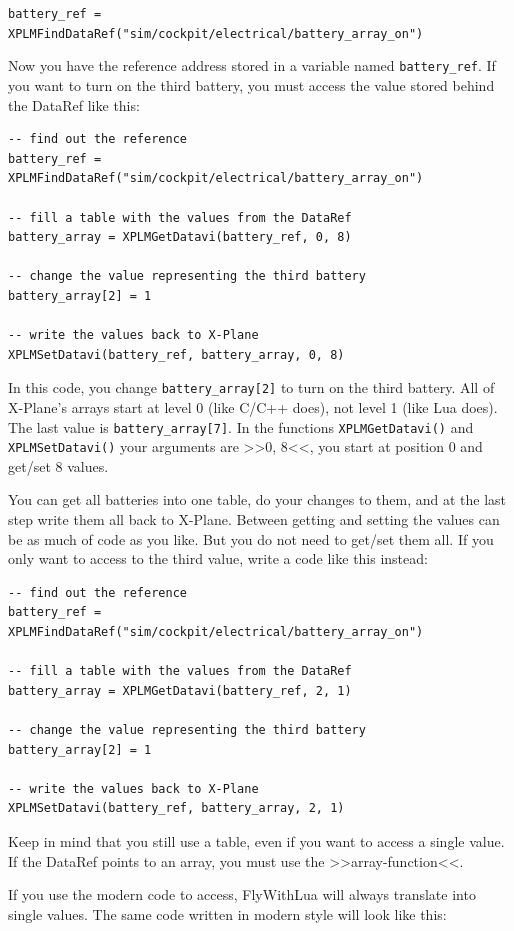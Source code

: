 \documentclass[11pt,parskip=half,a4paper]{scrartcl}
\begin{document}
\verb|battery_ref = XPLMFindDataRef("sim/cockpit/electrical/battery_array_on")|

Now you have the reference address stored in a variable named \verb|battery_ref|. If you want to turn on the third battery, you must access the value stored behind the DataRef like this:

\begin{lstlisting}
-- find out the reference
battery_ref = XPLMFindDataRef("sim/cockpit/electrical/battery_array_on")

-- fill a table with the values from the DataRef
battery_array = XPLMGetDatavi(battery_ref, 0, 8)

-- change the value representing the third battery
battery_array[2] = 1

-- write the values back to X-Plane
XPLMSetDatavi(battery_ref, battery_array, 0, 8)
\end{lstlisting}

In this code, you change \verb|battery_array[2]| to turn on the third battery. All of X-Plane's arrays start at level 0 (like C/C++ does), not level 1 (like Lua does). The last value is \verb|battery_array[7]|. In the functions \verb|XPLMGetDatavi()| and \verb|XPLMSetDatavi()| your arguments are >>0, 8<<, you start at position 0 and get/set 8 values.

You can get all batteries into one table, do your changes to them, and at the last step write them all back to X-Plane. Between getting and setting the values can be as much of code as you like. But you do not need to get/set them all. If you only want to access to the third value, write a code like this instead:

\begin{lstlisting}
-- find out the reference
battery_ref = XPLMFindDataRef("sim/cockpit/electrical/battery_array_on")

-- fill a table with the values from the DataRef
battery_array = XPLMGetDatavi(battery_ref, 2, 1)

-- change the value representing the third battery
battery_array[2] = 1

-- write the values back to X-Plane
XPLMSetDatavi(battery_ref, battery_array, 2, 1)
\end{lstlisting}

Keep in mind that you still use a table, even if you want to access a single value. If the DataRef points to an array, you must use the >>array-function<<.

If you use the modern code to access, FlyWithLua will always translate into single values. The same code written in modern style will look like this:
\end{document}
